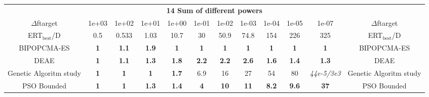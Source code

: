 \begin{tabular}{cccccccccccc}
 & \multicolumn{10}{c}{{\normalsize \textbf{14 Sum of different powers}}}\\
$\Delta$ftarget& 1e+03& 1e+02& 1e+01& 1e+00& 1e-01& 1e-02& 1e-03& 1e-04& 1e-05& 1e-07 & $\Delta$ftarget \\
ERT$_{\textrm{best}}$/D& 0.5& 0.533& 1.03& 10.7& 30& 50.9& 74.8& 154& 226& 325 & ERT$_{\textrm{best}}$/D \\
\hline
BIPOPCMA-ES & \textbf{1} & \textbf{1.1} & \textbf{1.9} & \textbf{1} & \textbf{1} & \textbf{1} & \textbf{1} & \textbf{1} & \textbf{1} & \textbf{1} & BIPOPCMA-ES \cite{add_an_entry_for_BIPOPCMA-ES_in_bbob.bib}\\
DEAE & \textbf{1} & \textbf{1.1} & \textbf{1.3} & \textbf{1.8} & \textbf{2.2} & \textbf{2.2} & \textbf{2.6} & \textbf{1.6} & \textbf{1.4} & \textbf{1.3} & DEAE \cite{add_an_entry_for_DEAE_in_bbob.bib}\\
Genetic Algoritm study & \textbf{1} & \textbf{1} & \textbf{1} & \textbf{1.7} & 6.9 & 16 & 27 & 54 & 80 & \textit{44e-5}\textit{/3e3} & Genetic Algoritm study \cite{add_an_entry_for_Genetic Algoritm study_in_bbob.bib}\\
PSO Bounded & \textbf{1} & \textbf{1} & \textbf{1.3} & \textbf{1.4} & \textbf{4} & \textbf{10} & \textbf{11} & \textbf{8.2} & \textbf{9.6} & \textbf{37} & PSO Bounded \cite{add_an_entry_for_PSO Bounded_in_bbob.bib}
\end{tabular}
